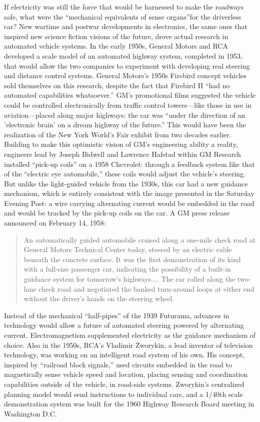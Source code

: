 If electricity was still the force that would be harnessed to make the
roadways safe, what were the ``mechanical equivalents of sense
organs''\cite{???-wiener}for the driverless car? New
wartime and postwar developments in electronics, the same ones that
inspired new science fiction visions of the future, drove actual
research in automated vehicle systems. In the early 1950s, General
Motors and RCA developed a scale model of an automated highway system,
completed in 1953, that would allow the two companies to experiment
with developing real steering and distance control systems.\cite{???}
General Motors's 1950s Firebird concept
vehicles sold themselves on this research, despite the fact that
Firebird II ``had no automated capabilities whatsoever.''\cite{???} GM's
promotional films suggested the vehicle could be controlled
electronically from traffic control towers---like those in use in
aviation---placed along major highways: the car was ``under the direction
of an 'electronic brain' on a dream highway of the future.''\cite{???} This
would have been the realization of the New York World's Fair exhibit
from two decades earlier. Building to make
this optimistic vision of GM's engineering ability a reality,
engineers lead by Joseph Bidwell and Lawrence Hafstad within GM
Research installed ``pick-up coils'' on a 1958 Chevrolet: through a
feedback system like that of the ``electric eye automobile,'' these
coils would adjust the vehicle's steering.\cite{???} But unlike the
light-guided vehicle from the 1930s, this car had a new guidance
mechanism, which is entirely consistent with the image presented in
the Saturday Evening Post: a wire carrying alternating current would
be embedded in the road and would be tracked by the pick-up coils on
the car. A GM press release announced on February 14, 1958:
\begin{quote}
An automatically guided automobile cruised along a one-mile check road
at General Motors Technical Center today, steered by an electric cable
beneath the concrete surface. It was the first demonstration of its
kind with a full-size passenger car, indicating the possibility of a
built-in guidance system for tomorrow’s highways.... The car rolled
along the two-lane check road and negotiated the banked turn-around
loops at either end without the driver’s hands on the steering wheel.\cite{???}
\end{quote}

Instead of the mechanical ``half-pipes'' of the 1939 Futurama, advances in
technology would allow a future of automated steering powered
by alternating current. Electromagnetism supplemented electricity as the
guidance mechanism of choice. Also in the 1950s, RCA's
Vladimir Zworykin, a lead inventor of television technology, was
working on an intelligent road system of his own. His concept,
inspired by ``railroad block signals,'' used circuits embedded in the
road to magnetically sense vehicle speed and location, placing sensing
and coordination capabilities outside of the vehicle, in road-side
systems.\cite{???} Zworykin's centralized planning model would send
instructions to individual cars, and a 1/40th scale demonstration
system was built for the 1960 Highway Research Board meeting in
Washington D.C.\cite{???}

